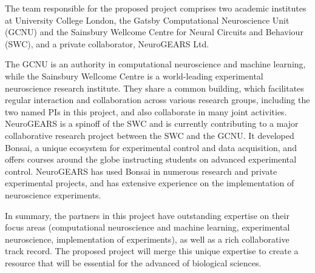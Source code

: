 The team responsible for the proposed project comprises two academic
institutes at University College London, the Gatsby Computational Neuroscience Unit (GCNU) and the Sainsbury
Wellcome Centre for Neural Circuits and Behaviour (SWC), and a private
collaborator, NeuroGEARS Ltd.

The GCNU is an authority in computational neuroscience and
machine learning, while the Sainsbury Wellcome Centre is a world-leading experimental
neuroscience research institute. They share a common building, which facilitates regular interaction and collaboration across various research groups, including the two named PIs in this project, and also collaborate in many joint activities.
%
NeuroGEARS is a spinoff of the SWC and is currently contributing to a major
collaborative research project between the SWC and the GCNU. It developed
Bonsai, a unique ecosystem for experimental control and data acquisition,
and offers courses around the globe instructing students on advanced
experimental control. NeuroGEARS has used Bonsai in numerous research and private experimental projects, and has extensive experience on the
implementation of neuroscience experiments.

In summary, the partners in this project have outstanding expertise on their focus areas (computational neuroscience and machine learning, experimental
neuroscience, implementation of experiments), as well as a rich collaborative
track record. The proposed project will merge this unique expertise to create a
resource that will be essential for the advanced of biological sciences.
